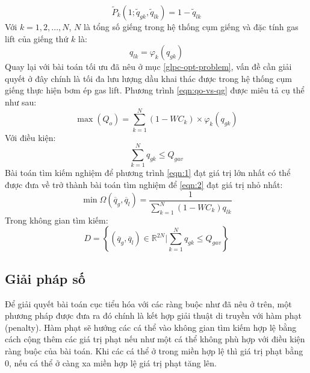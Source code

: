 \documentclass[12pt,a4paper]{report}
\begin{document}
	\begin{equation}\label{eqn:P-z=1}
		\widetilde{P}_k(1; \widetilde{q}_{gk}, \widetilde{q}_{lk}) = 1 - \widetilde{q}_{lk}
	\end{equation}
Với $k = 1, 2, ... , N$, $N$ là tổng số giếng trong hệ thống cụm giếng và đặc tính gas lift của giếng thứ $k$ là:
	\begin{equation}
		q_{lk} = \varphi_k(q_{gk})
	\end{equation}
Quay lại với bài toán tối ưu đã nêu ở mục \ref{glpc-opt-problem}, vấn đề cần giải quyết ở đây chính là tối đa lưu lượng dầu khai thác được trong hệ thống cụm giếng thực hiện bơm ép gas lift. Phương trình \ref{eqn:qo-vs-qg} được miêu tả cụ thể như sau:
	\begin{equation}\label{eqn:1}
		\max(Q_o) = \sum_{k=1}^N(1 - WC_k) \times \varphi_k(q_{gk})
	\end{equation}
Với điều kiện:
	\begin{equation}
		\sum_{k=1}^Nq_{gk} \leq Q_{gav}
	\end{equation}
Bài toán tìm kiếm nghiệm để phương trình \ref{eqn:1} đạt giá trị lớn nhất có thể được đưa về trở thành bài toán tìm nghiệm để \ref{eqn:2} đạt giá trị nhỏ nhất:
	\begin{equation}\label{eqn:2}
		\min \Omega(\overline q_g, \overline q_l) = \dfrac{1}{\sum_{k=1}^N(1 - WC_k)q_{lk}}
	\end{equation}
Trong không gian tìm kiếm:
	\begin{equation}\label{eqn:3}
		D = \left\{(\overline q_g, \overline q_l) \in \mathbb{R}^{2N} |\sum_{k=1}^Nq_{gk} \leq Q_{gav}\right\}
	\end{equation}

\subsection{Giải pháp số}
Để giải quyết bài toán cục tiểu hóa với các ràng buộc như đã nêu ở trên, một phương pháp được đưa ra đó chính là kết hợp giải thuật di truyền với hàm phạt (penalty). Hàm phạt sẽ hướng các cá thể vào không gian tìm kiếm hợp lệ bằng cách cộng thêm các giá trị phạt nếu như một cá thể không phù hợp với điều kiện ràng buộc của bài toán. Khi các cá thể ở trong miền hợp lệ thì giá trị phạt bằng 0, nếu cá thể ở càng xa miền hợp lệ giá trị phạt tăng lên.
\end{document}
